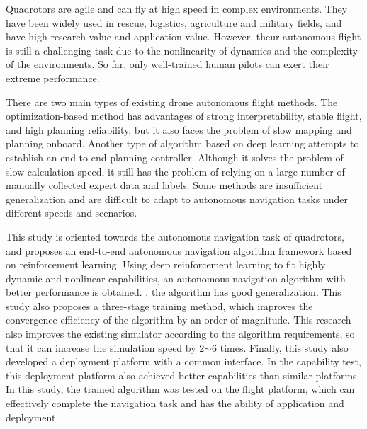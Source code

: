 \begin{abstract*}

  Quadrotors are agile and can fly at high speed in complex environments. They have been widely used in rescue, logistics, agriculture and military fields, and have high research value and application value. However, theur autonomous flight is still a challenging task due to the nonlinearity of dynamics and the complexity of the environments. So far, only well-trained human pilots can exert their extreme performance.

  There are two main types of existing drone autonomous flight methods. The optimization-based method has advantages of strong interpretability, stable flight, and high planning reliability, but it also faces the problem of slow mapping and planning onboard. Another type of algorithm based on deep learning attempts to establish an end-to-end planning controller. Although it solves the problem of slow calculation speed, it still has the problem of relying on a large number of manually collected expert data and labels. Some methods are insufficient generalization and are difficult to adapt to autonomous navigation tasks under different speeds and scenarios.

  This study is oriented towards the autonomous navigation task of quadrotors, and proposes an end-to-end autonomous navigation algorithm framework based on reinforcement learning. Using deep reinforcement learning to fit highly dynamic and nonlinear capabilities, an autonomous navigation algorithm with better performance is obtained. , the algorithm has good generalization. This study also proposes a three-stage training method, which improves the convergence efficiency of the algorithm by an order of magnitude. This research also improves the existing simulator according to the algorithm requirements, so that it can increase the simulation speed by 2$\sim$6 times. Finally, this study also developed a deployment platform with a common interface. In the capability test, this deployment platform also achieved better capabilities than similar platforms. In this study, the trained algorithm was tested on the flight platform, which can effectively complete the navigation task and has the ability of application and deployment.

\end{abstract*}
